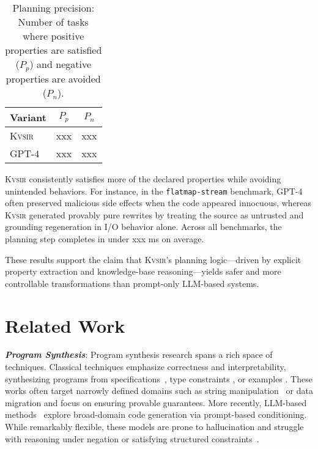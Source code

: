 \documentclass[sigplan]{acmart}
\newcommand{\sys}{{\scshape Kv{\textalpha}sir}\xspace}
\newcommand{\heading}[1]{\vspace{2pt}\noindent\textbf{\emph{#1}}:\enspace}
\newcommand{\xxx}{\colorbox{red!30}{xxx}\xspace}
\begin{document}
\begin{table}[h]
  \centering
  \caption{
    Planning precision: Number of tasks where positive properties are satisfied ($P_p$) and negative properties are avoided ($P_n$).
  }
  \begin{tabular}{lcc}
    \toprule
    Variant & $P_{p}$ & $P_{n}$  \\
    \midrule
    \sys & \xxx & \xxx \\
    GPT-4 & \xxx & \xxx \\
    \bottomrule
  \end{tabular}
\end{table}

\sys consistently satisfies more of the declared properties while avoiding unintended behaviors. For instance, in the \texttt{flatmap-stream} benchmark, GPT-4 often preserved malicious side effects when the code appeared innocuous, whereas \sys generated provably pure rewrites by treating the source as untrusted and grounding regeneration in I/O behavior alone.
Across all benchmarks, the planning step completes in under \xxx ms on average.

These results support the claim that \sys's planning logic---driven by explicit
property extraction and knowledge-base reasoning---yields safer and more
controllable transformations than prompt-only LLM-based systems.

\section{Related Work}

\heading{Program Synthesis}
Program synthesis research spans a rich space of techniques.
Classical techniques emphasize correctness and
interpretability, synthesizing programs from specifications~\cite{alur2013syntax, feser2015synthesizing, gulwani2011automating},
type constraints \cite{polikarpova2016program},
or examples \cite{jha2010oracle, raza2018disjunctive, singh2016blinkfill}.
These works often target narrowly
defined domains such as string manipulation~\cite{harp:ccs:2021} or data migration
\cite{yaghmazadeh2018automated} and focus on ensuring provable guarantees.
More recently, LLM-based methods~\cite{austin2021program, chen2021evaluating}
explore broad-domain code generation via prompt-based conditioning.
While remarkably flexible, these models are prone to hallucination and struggle
with reasoning under negation or satisfying structured constraints~\cite{xu2023llmfoolitselfpromptbased, wu2023deceptpromptexploitingllmdrivencode,jiang2024llmsdreamelephantswhen,hwang2024thinkpinkelephant}.
\end{document}

